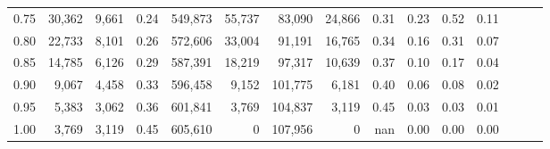 \begin{tabular}{rrrrrrrrrrrrrrr}
0.75 &  30,362 &   9,661 &  0.24 &  549,873 &   55,737 &   83,090 &   24,866 &  0.31 &  0.23 &  0.52 &      0.11 \\
0.80 &  22,733 &   8,101 &  0.26 &  572,606 &   33,004 &   91,191 &   16,765 &  0.34 &  0.16 &  0.31 &      0.07 \\
0.85 &  14,785 &   6,126 &  0.29 &  587,391 &   18,219 &   97,317 &   10,639 &  0.37 &  0.10 &  0.17 &      0.04 \\
0.90 &   9,067 &   4,458 &  0.33 &  596,458 &    9,152 &  101,775 &    6,181 &  0.40 &  0.06 &  0.08 &      0.02 \\
0.95 &   5,383 &   3,062 &  0.36 &  601,841 &    3,769 &  104,837 &    3,119 &  0.45 &  0.03 &  0.03 &      0.01 \\
1.00 &   3,769 &   3,119 &  0.45 &  605,610 &        0 &  107,956 &        0 &   nan &  0.00 &  0.00 &      0.00 \\
\bottomrule
\end{tabular}
